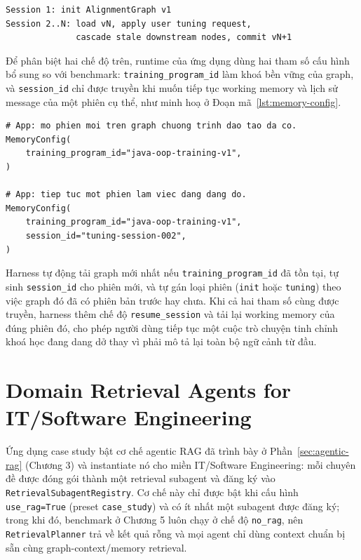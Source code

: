 \documentclass[../main.tex]{subfiles}
\begin{document}
\begin{verbatim}
Session 1: init AlignmentGraph v1
Session 2..N: load vN, apply user tuning request,
              cascade stale downstream nodes, commit vN+1
\end{verbatim}

Để phân biệt hai chế độ trên, runtime của ứng dụng dùng hai tham số cấu hình bổ sung so với benchmark: \texttt{training\_program\_id} làm khoá bền vững của graph, và \texttt{session\_id} chỉ được truyền khi muốn tiếp tục working memory và lịch sử message của một phiên cụ thể, như minh hoạ ở Đoạn mã~\ref{lst:memory-config}.

\begin{verbatim}
# App: mo phien moi tren graph chuong trinh dao tao da co.
MemoryConfig(
    training_program_id="java-oop-training-v1",
)

# App: tiep tuc mot phien lam viec dang dang do.
MemoryConfig(
    training_program_id="java-oop-training-v1",
    session_id="tuning-session-002",
)
\end{verbatim}
\label{lst:memory-config}

Harness tự động tải graph mới nhất nếu \texttt{training\_program\_id} đã tồn tại, tự sinh \texttt{session\_id} cho phiên mới, và tự gán loại phiên (\texttt{init} hoặc \texttt{tuning}) theo việc graph đó đã có phiên bản trước hay chưa. Khi cả hai tham số cùng được truyền, harness thêm chế độ \texttt{resume\_session} và tải lại working memory của đúng phiên đó, cho phép người dùng tiếp tục một cuộc trò chuyện tinh chỉnh khoá học đang dang dở thay vì phải mô tả lại toàn bộ ngữ cảnh từ đầu.

\section{Domain Retrieval Agents for IT/Software Engineering}

Ứng dụng case study bật cơ chế agentic RAG đã trình bày ở Phần~\ref{sec:agentic-rag} (Chương 3) và instantiate nó cho miền IT/Software Engineering: mỗi chuyên đề được đóng gói thành một retrieval subagent và đăng ký vào \texttt{RetrievalSubagentRegistry}. Cơ chế này chỉ được bật khi cấu hình \texttt{use\_rag=True} (preset \texttt{case\_study}) và có ít nhất một subagent được đăng ký; trong khi đó, benchmark ở Chương 5 luôn chạy ở chế độ \texttt{no\_rag}, nên \texttt{RetrievalPlanner} trả về kết quả rỗng và mọi agent chỉ dùng context chuẩn bị sẵn cùng graph-context/memory retrieval.
\end{document}
